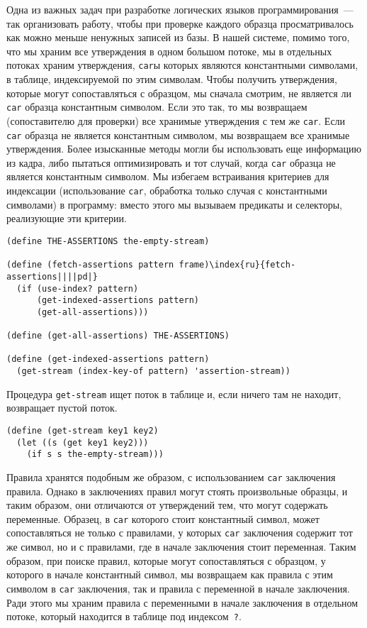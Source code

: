 Одна 
из важных задач при разработке логических языков
программирования~--- так организовать работу, чтобы при проверке
каждого образца просматривалось как можно меньше ненужных записей из
базы.  В нашей системе, помимо того, что мы храним все утверждения в
одном большом потоке, мы в отдельных потоках храним утверждения,
{\tt car}ы которых являются константными символами, в
таблице, индексируемой по этим символам.  Чтобы получить утверждения,
которые могут сопоставляться с образцом, мы сначала смотрим, не
является ли {\tt car} образца константным символом.  Если это
так, то мы возвращаем (сопоставителю для проверки) все хранимые
утверждения с тем же {\tt car}.  Если {\tt car} образца
не является константным символом, мы возвращаем все хранимые
утверждения.  Более изысканные методы могли бы использовать еще
информацию из кадра, либо пытаться оптимизировать и тот случай, когда
{\tt car} образца не является константным символом.  Мы
избегаем встраивания критериев для индексации (использование
{\tt car}, обработка только случая с константными символами) в
программу: вместо этого мы вызываем предикаты и селекторы, реализующие
эти критерии.

\begin{Verbatim}[fontsize=\small]
(define THE-ASSERTIONS the-empty-stream)

(define (fetch-assertions pattern frame)\index{ru}{fetch-assertions||||pd|}
  (if (use-index? pattern)
      (get-indexed-assertions pattern)
      (get-all-assertions)))

(define (get-all-assertions) THE-ASSERTIONS)

(define (get-indexed-assertions pattern)
  (get-stream (index-key-of pattern) 'assertion-stream))
\end{Verbatim}

Процедура {\tt get-stream} ищет поток в таблице и,
если ничего там не находит, возвращает пустой поток.

\begin{Verbatim}[fontsize=\small]
(define (get-stream key1 key2)
  (let ((s (get key1 key2)))
    (if s s the-empty-stream)))
\end{Verbatim}

Правила хранятся подобным же образом, с использованием
{\tt car} заключения правила.  Однако в заключениях правил могут
стоять произвольные образцы, и таким образом, они отличаются от
утверждений тем, что могут содержать переменные. Образец, в
{\tt car} которого стоит константный символ, может
сопоставляться не только с правилами, у которых {\tt car} заключения
содержит тот же символ, но и с правилами, где в начале заключения стоит
переменная. Таким образом, при поиске правил, которые могут
сопоставляться с образцом, у которого в начале константный символ, мы
возвращаем как правила с этим символом в {\tt car} заключения,
так и правила с переменной в начале заключения.  Ради этого мы храним
правила с переменными в начале заключения в отдельном потоке, который
находится в таблице под индексом~{\tt ?}.


